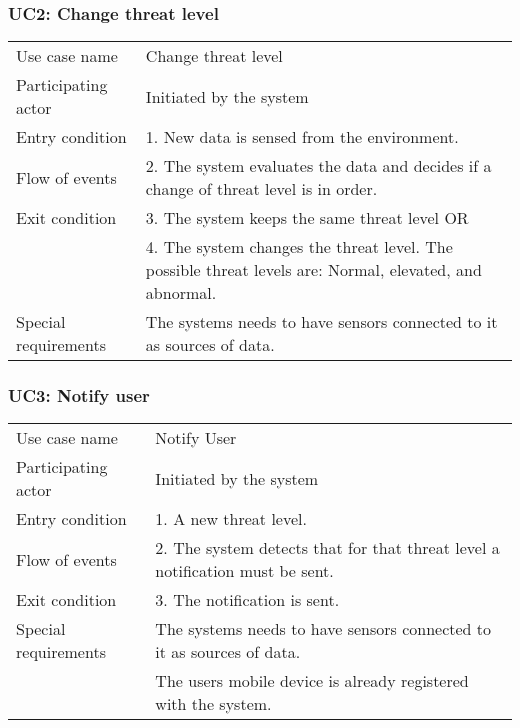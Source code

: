 \subsubsection{UC2: Change threat level}
\label{sec:changeThreatLevel}
\begin{tabular}{ l p{11cm} }
	\hline                       
	Use case name & Change threat level\\
	Participating actor & Initiated by the system\\
	Entry condition & 1. New data is sensed from the environment. \\
	Flow of events & 2. The system evaluates the data and decides if a change of threat level is in order.\\
	Exit condition & 3. The system keeps the same threat level OR \\
	& 4. The system changes the threat level.  The possible threat levels are: Normal, elevated, and abnormal. \\
	Special requirements & The systems needs to have sensors connected to it as sources of data. \\
	\hline
\end{tabular}

\subsubsection{UC3: Notify user}
\label{sec:notify}
\begin{tabular}{ l p{11cm} }
	\hline                       
	Use case name & Notify User\\
	Participating actor & Initiated by the system\\
	Entry condition & 1. A new threat level. \\
	Flow of events & 2. The system detects that for that threat level a notification must be sent.\\
	Exit condition & 3. The notification is sent. \\
	Special requirements & The systems needs to have sensors connected to it as sources of data.\\
	& The users mobile device is already registered with the system.\\
	\hline
\end{tabular}

